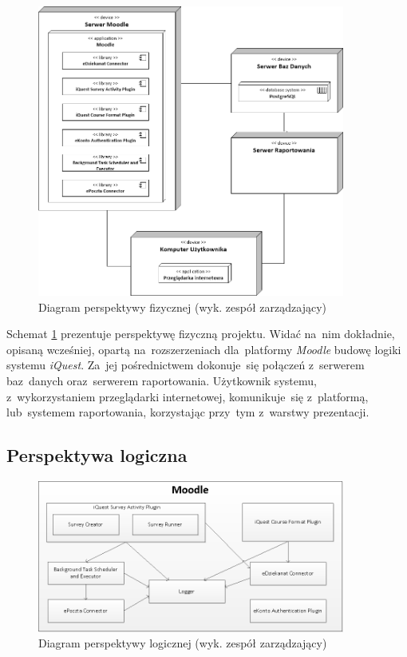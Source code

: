 \begin{figure}[H]
\centering\includegraphics[width=0.9\textwidth]{figures/PhysicalView}
\caption{Diagram perspektywy fizycznej (wyk. zespół zarządzający)}\label{rys:PerspektywaFizyczna}
\end{figure}

Schemat \ref{rys:PerspektywaFizyczna} prezentuje perspektywę fizyczną projektu. Widać na~nim dokładnie, opisaną wcześniej, opartą na~rozszerzeniach dla~platformy \textit{Moodle} budowę logiki systemu \textit{iQuest}. Za~jej pośrednictwem dokonuje~się połączeń z~serwerem baz~danych oraz~serwerem raportowania. Użytkownik systemu, z~wykorzystaniem przeglądarki internetowej, komunikuje~się z~platformą, lub~systemem raportowania, korzystając przy~tym z~warstwy prezentacji.

\subsection{Perspektywa logiczna}
\label{Chapter542}

\begin{figure}[H]
\centering\includegraphics[width=0.9\textwidth]{figures/LogicalView}
\caption{Diagram perspektywy logicznej (wyk. zespół zarządzający)}\label{rys:PerspektywaLogiczna}
\end{figure}


